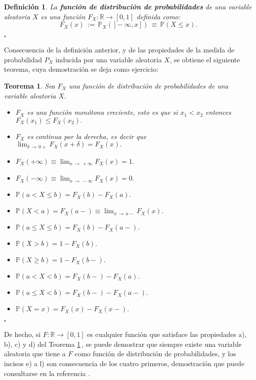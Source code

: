 \documentclass[spanish,10pt,letterpaper]{article}
\newtheorem{defi}{Definición}
\newtheorem{teo}{Teorema}
\newcommand{\prob}{\mathbb{P}}
\newcommand{\Runo}{\mathbb{R}}
\newcommand{\qed}{\begin{flushright}$\square$\end{flushright}}
\begin{document}
	\begin{defi}\label{def:Fndistrib}
		La \textbf{función de distribución de probabilidades} de una variable aleatoria $X$ es una función $F_X:\Runo\rightarrow[0,1]$ definida como:
		$$F_X(x) \,:=\, \prob_X(\,]-\infty,x\,]\,) \,\equiv\, \prob(X\leq x).$$ \qed 
	\end{defi}
	
	Consecuencia de la definición anterior, y de las propiedades de la medida de probabilidad $P_X$ inducida por una variable aleatoria $X$, se obtiene el siguiente teorema, cuya demostración se deja como ejercicio:
	
	\bigskip 
	
	\begin{teo}\label{teo:Fdist}
		Sea $F_X$ una función de distribución de probabilidades de una variable aleatoria $X.$
		\begin{itemize}
			\item[a)] $F_X$ es una función monótona creciente, esto es que si $x_1<x_2$ entonces $F_X(x_1)\leq F_X(x_2).$
			\item[b)] $F_X$ es continua por la derecha, es decir que $\lim_{\delta\,\rightarrow\,0+}F_X(x+\delta)=F_X(x).$
			\item[c)] $F_X(+\infty) \equiv \lim_{x\,\rightarrow\,+\infty}F_X(x) = 1.$
			\item[d)] $F_X(-\infty) \equiv \lim_{x\,\rightarrow\,-\infty}F_X(x) = 0.$
			\item[e)] $\prob(a<X\leq b)=F_X(b)-F_X(a).$
			\item[f)] $\prob(X<a)=F_X(a-)\equiv\lim_{x\,\rightarrow\,a-}F_X(x).$
			\item[g)] $\prob(a\leq X\leq b)=F_X(b)-F_X(a-).$
			\item[h)] $\prob(X > b)=1-F_X(b).$
			\item[i)] $\prob(X \geq b)=1-F_X(b-).$
			\item[j)] $\prob(a<X<b)=F_X(b-)-F_X(a).$
			\item[k)] $\prob(a\leq X<b)=F_X(b-)-F_X(a-).$
			\item[l)] $\prob(X=x)=F_X(x)-F_X(x-).$
		\end{itemize} \qed 
	\end{teo}
	
	De hecho, si $F:\Runo\rightarrow[0,1]$ es cualquier función que satisface las propiedades a), b), c) y d) del Teorema \ref{teo:Fdist}\,, se puede demostrar que siempre existe una variable aleatoria que tiene a $F$ como función de distribución de probabilidades, y los incisos e) a l) son consecuencia de los cuatro primeros, demostración que puede consultarse en la referencia \cite{Domínguez}.
\end{document}
